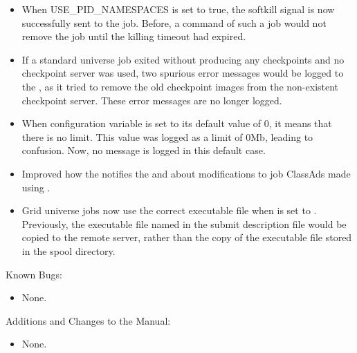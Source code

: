 \begin{itemize}

\item When USE\_PID\_NAMESPACES is set to true, the softkill
signal is now successfully sent to the job.  Before, a 
command of such a job would not remove the job until the
killing timeout had expired.

\item If a standard universe job exited without producing any
checkpoints and no checkpoint server was used, 
two spurious error messages would be logged to the ,
as it tried to remove the old checkpoint images from the
non-existent checkpoint server.  
These error messages are no longer logged.

\item When configuration variable  is set 
to its default value of 0, it means that there is no limit.  
This value was logged as a limit of 0Mb, leading to confusion.
Now, no message is logged in this default case.

\item Improved how the  notifies the 
and  about modifications to job ClassAds made using
.

\item Grid universe jobs now use the correct executable file when
 is set to .
Previously, the executable file named in the submit description file 
would be copied to the remote server, 
rather than the copy of the executable file stored in the spool directory.

\end{itemize}

\noindent Known Bugs:

\begin{itemize}

\item None.

\end{itemize}

\noindent Additions and Changes to the Manual:

\begin{itemize}

\item None.

\end{itemize}



